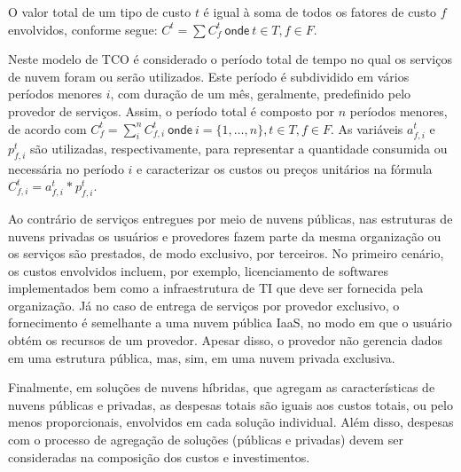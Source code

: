 \documentclass[tese,capa]{texufpel}
\begin{document}
O valor total de um tipo de custo $t$ é igual à soma de todos os fatores de custo $f$ envolvidos, conforme segue: $C^t = \sum C^t_f ~\textsf{onde}~ t \in T, f \in F$. 

Neste modelo de TCO é considerado o período total de tempo no qual os serviços de nuvem foram ou serão utilizados. Este período é subdividido em vários períodos menores $i$, com duração de um mês, geralmente, predefinido pelo provedor de serviços. Assim, o período total é composto por $n$ períodos menores, de acordo com $C^t_f = \sum^n_i C^t_{f,i} ~\textsf{onde}~ i = \{1, \dots, n\}, t \in T, f \in F$. As variáveis $a^t_{f,i}$ e $p^t_{f,i}$ são utilizadas, respectivamente, para representar a quantidade consumida ou necessária no período $i$ e caracterizar os custos ou preços unitários na fórmula $C^t_{f,i} = a^t_{f,i} ~\textsf{*}~ p^t_{f,i}$.

Ao contrário de serviços entregues por meio de nuvens públicas, nas estruturas de nuvens privadas os usuários e provedores fazem parte da mesma organização ou os serviços são prestados, de modo exclusivo, por terceiros. No primeiro cenário, os custos envolvidos incluem, por exemplo, licenciamento de softwares implementados bem como a infraestrutura de TI que deve ser fornecida pela organização. Já no caso de entrega de serviços por provedor exclusivo, o fornecimento é semelhante a uma nuvem pública IaaS, no modo em que o usuário obtém os recursos de um provedor. Apesar disso, o provedor não gerencia dados em uma estrutura pública, mas, sim, em uma nuvem privada exclusiva. 

Finalmente, em soluções de nuvens híbridas, que agregam as características de nuvens públicas e privadas, as despesas totais são iguais aos custos totais, ou pelo menos proporcionais, envolvidos em cada solução individual. Além disso, despesas com o processo de agregação de soluções (públicas e privadas) devem ser consideradas na composição dos custos e investimentos.


\end{document}

